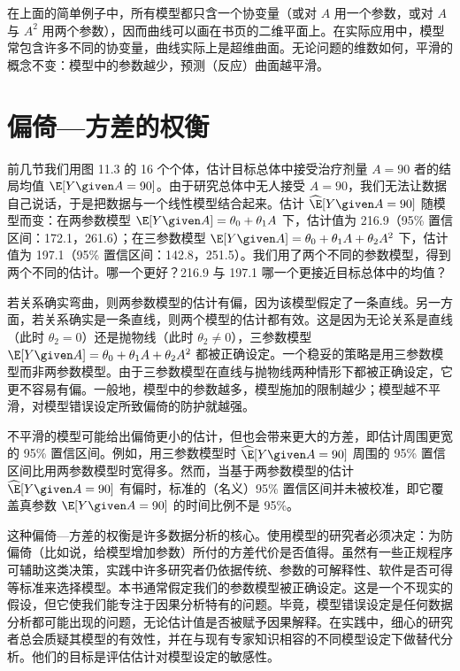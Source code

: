 
在上面的简单例子中，所有模型都只含一个协变量（或对 $A$ 用一个参数，或对 $A$ 与 $A^2$ 用两个参数），因而曲线可以画在书页的二维平面上。在实际应用中，模型常包含许多不同的协变量，曲线实际上是超维曲面。无论问题的维数如何，平滑的概念不变：模型中的参数越少，预测（反应）曲面越平滑。

\section{偏倚—方差的权衡}

前几节我们用图 11.3 的 16 个个体，估计目标总体中接受治疗剂量 $A=90$ 者的结局均值 $\E[Y\given A=90]$。由于研究总体中无人接受 $A=90$，我们无法让数据自己说话，于是把数据与一个线性模型结合起来。估计 $\widehat{\E}[Y\given A=90]$ 随模型而变：在两参数模型 $\E[Y\given A]=\theta_0+\theta_1 A$ 下，估计值为 216.9（95\% 置信区间：172.1，261.6）；在三参数模型 $\E[Y\given A]=\theta_0+\theta_1 A+\theta_2 A^2$ 下，估计值为 197.1（95\% 置信区间：142.8，251.5）。我们用了两个不同的参数模型，得到两个不同的估计。哪一个更好？216.9 与 197.1 哪一个更接近目标总体中的均值？

若关系确实弯曲，则两参数模型的估计有偏，因为该模型假定了一条直线。另一方面，若关系确实是一条直线，则两个模型的估计都有效。这是因为无论关系是直线（此时 $\theta_2=0$）还是抛物线（此时 $\theta_2\neq0$），三参数模型 $\E[Y\given A]=\theta_0+\theta_1 A+\theta_2 A^2$ 都被正确设定。一个稳妥的策略是用三参数模型而非两参数模型。由于三参数模型在直线与抛物线两种情形下都被正确设定，它更不容易有偏。一般地，模型中的参数越多，模型施加的限制越少；模型越不平滑，对模型错误设定所致偏倚的防护就越强。

不平滑的模型可能给出偏倚更小的估计，但也会带来更大的方差，即估计周围更宽的 95\% 置信区间。例如，用三参数模型时 $\widehat{\E}[Y\given A=90]$ 周围的 95\% 置信区间比用两参数模型时宽得多。然而，当基于两参数模型的估计 $\widehat{\E}[Y\given A=90]$ 有偏时，标准的（名义）95\% 置信区间并未被校准，即它覆盖真参数 $\E[Y\given A=90]$ 的时间比例不是 95\%。

这种偏倚—方差的权衡是许多数据分析的核心。使用模型的研究者必须决定：为防偏倚（比如说，给模型增加参数）所付的方差代价是否值得。虽然有一些正规程序可辅助这类决策，实践中许多研究者仍依据传统、参数的可解释性、软件是否可得等标准来选择模型。本书通常假定我们的参数模型被正确设定。这是一个不现实的假设，但它使我们能专注于因果分析特有的问题。毕竟，模型错误设定是任何数据分析都可能出现的问题，无论估计值是否被赋予因果解释。在实践中，细心的研究者总会质疑其模型的有效性，并在与现有专家知识相容的不同模型设定下做替代分析。他们的目标是评估估计对模型设定的敏感性。

